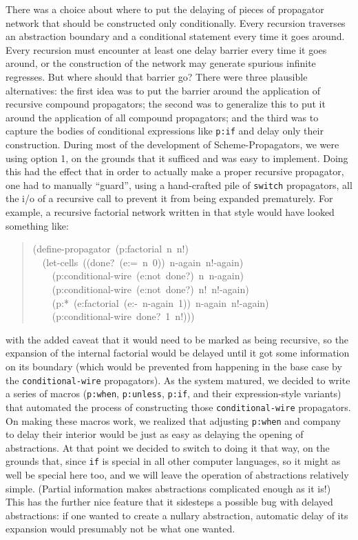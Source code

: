 \documentclass[12pt,letterpaper,english]{article}
\begin{document}
There was a choice about where to put the delaying of pieces
of propagator network that should be constructed only conditionally.
Every recursion traverses an abstraction boundary and a conditional
statement every time it goes around.  Every recursion must encounter
at least one delay barrier every time it goes around, or the
construction of the network may generate spurious infinite regresses.
But where should that barrier go?  There were three plausible
alternatives: the first idea was to put the barrier around the
application of recursive compound propagators; the second was to
generalize this to put it around the application of all compound
propagators; and the third was to capture the bodies of conditional
expressions like \texttt{p:if} and delay only their construction.  During
most of the development of Scheme-Propagators, we were using option 1,
on the grounds that it sufficed and was easy to implement.  Doing this
had the effect that in order to actually make a proper recursive
propagator, one had to manually ``guard'', using a hand-crafted pile of
\texttt{switch} propagators, all the i/o of a recursive call to prevent it
from being expanded prematurely.  For example, a recursive factorial
network written in that style would have looked something like:
\begin{quote}{\ttfamily \raggedright \noindent
(define-propagator~(p:factorial~n~n!)~\\
~~(let-cells~((done?~(e:=~n~0))~n-again~n!-again)~\\
~~~~(p:conditional-wire~(e:not~done?)~n~n-again)~\\
~~~~(p:conditional-wire~(e:not~done?)~n!~n!-again)~\\
~~~~(p:*~(e:factorial~(e:-~n-again~1))~n-again~n!-again)~\\
~~~~(p:conditional-wire~done?~1~n!)))
}\end{quote}
with the added caveat that it would need to be marked as being
recursive, so the expansion of the internal factorial would be delayed
until it got some information on its boundary (which would be
prevented from happening in the base case by the \texttt{conditional-wire}
propagators).  As the system matured, we decided to write a
series of macros (\texttt{p:when}, \texttt{p:unless}, \texttt{p:if}, and their
expression-style variants) that automated the process of constructing
those \texttt{conditional-wire} propagators.  On making these macros work,
we realized that adjusting \texttt{p:when} and company to delay their
interior would be just as easy as delaying the opening of
abstractions.  At that point we decided to switch to doing it that
way, on the grounds that, since \texttt{if} is special in all other computer
languages, so it might as well be special here too, and we will leave
the operation of abstractions relatively simple.  (Partial information
makes abstractions complicated enough as it is!)  This has the further
nice feature that it sidesteps a possible bug with delayed
abstractions: if one wanted to create a nullary
abstraction, automatic delay of its expansion would presumably not be
what one wanted.
\end{document}
